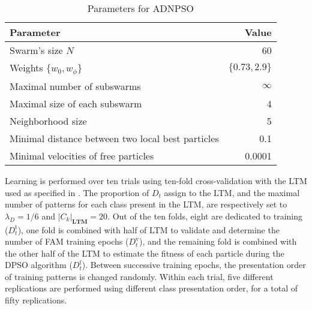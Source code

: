 \begin{table}[t]
  \centering
  \caption{Parameters for ADNPSO}
  \begin{tabular*}{\linewidth}{@{\extracolsep{\fill}}|lr|}
  	\hline
	  \textbf{Parameter} & \textbf{Value}     										\\ \hline
		Swarm's size $N$												&  60    						\\
		Weights $\{w_0,w_\phi\}$								&  $\{0.73,2.9\}$ 	\\
		Maximal number of subswarms   					&  $\infty$					\\
		Maximal size of each subswarm 					&  4								\\
		Neighborhood size												&  5    						\\
		Minimal distance between two local best particles &  0.1    \\
		Minimal velocities of free particles    &  0.0001    				\\ \hline
	\end{tabular*}
	\label{tab:c3_pso}
\end{table}

Learning is performed over ten trials using ten-fold cross-validation with the LTM used as specified in \cite{connolly10}.
The proportion of $D_t$ assign to the LTM, and the maximal number of patterns for each class present in the LTM, are respectively set to $\lambda_D=1/6$ and $|C_k|_\mathbf{LTM}=20$.
Out of the ten folds, eight are dedicated to training ($D_t^\text{t}$), one fold is combined with half of LTM to validate and determine the number of FAM training epochs ($D_t^\text{v}$), and the remaining fold is combined with the other half of the LTM to estimate the fitness of each particle during the DPSO algorithm ($D_t^\text{f}$).
Between successive training epochs, the presentation order of training patterns is changed randomly.
Within each trial, five different replications are performed using different class presentation order, for a total of fifty replications.

